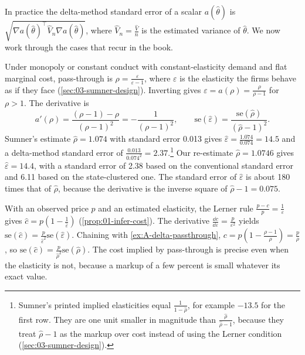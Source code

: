 In practice the delta-method standard error of a scalar $a(\hat\theta)$ is $\sqrt{\nabla a(\hat\theta)^\top\hat
V_n\nabla a(\hat\theta)}$, where $\hat V_n = \frac{\hat V}{n}$ is the estimated variance of $\hat\theta$. We now work
through the cases that recur in the book.

\begin{example}\label{ex:A-delta-passthrough}
Under monopoly or constant conduct with constant-elasticity demand and flat marginal cost, pass-through is $\rho =
\frac{\varepsilon}{\varepsilon - 1}$, where $\varepsilon$ is the elasticity the firms behave as if they face
(\cref{sec:03-sumner-design}). Inverting gives $\varepsilon = a(\rho) = \frac{\rho}{\rho - 1}$ for $\rho > 1$. The
derivative is
\begin{equation*}
  a'(\rho) = \frac{(\rho - 1) - \rho}{(\rho - 1)^2} = -\frac{1}{(\rho - 1)^2},
  \qquad \mathrm{se}(\hat\varepsilon) = \frac{\mathrm{se}(\hat\rho)}{(\hat\rho - 1)^2}.
\end{equation*}
Sumner's estimate $\hat\rho = 1.074$ with standard error 0.013 gives $\hat\varepsilon = \frac{1.074}{0.074} = 14.5$ and
a delta-method standard error of $\frac{0.013}{0.074^2} = 2.37$.\footnote{Sumner's printed implied elasticities equal
$\frac{1}{1 - \hat\rho}$, for example $-13.5$ for the first row. They are one unit smaller in magnitude than
$\frac{\hat\rho}{\hat\rho - 1}$, because they treat $\hat\rho - 1$ as the markup over cost instead of using the Lerner
condition (\cref{sec:03-sumner-design}).} Our re-estimate $\hat\rho = 1.0746$ gives $\hat\varepsilon = 14.4$, with a
standard error of 2.38 based on the conventional standard error and 6.11 based on the state-clustered one. The
standard error of $\hat\varepsilon$ is about 180 times that of $\hat\rho$, because the derivative is the inverse
square of $\hat\rho - 1 = 0.075$.
\end{example}

\begin{example}\label{ex:A-delta-cost}
With an observed price $p$ and an estimated elasticity, the Lerner rule $\frac{p - c}{p} = \frac{1}{\varepsilon}$
gives $\hat c = p(1 - \frac{1}{\hat\varepsilon})$ (\cref{prop:01-infer-cost}). The derivative
$\frac{\dd c}{\dd\varepsilon} = \frac{p}{\varepsilon^2}$ yields $\mathrm{se}(\hat c) = \frac{p}{\hat\varepsilon^2}
\mathrm{se}(\hat\varepsilon)$. Chaining with \cref{ex:A-delta-passthrough}, $c = p(1 - \frac{\rho - 1}{\rho}) =
\frac{p}{\rho}$, so $\mathrm{se}(\hat c) = \frac{p}{\hat\rho^2}\mathrm{se}(\hat\rho)$. The cost implied by
pass-through is precise even when the elasticity is not, because a markup of a few percent is small whatever its
exact value.
\end{example}


